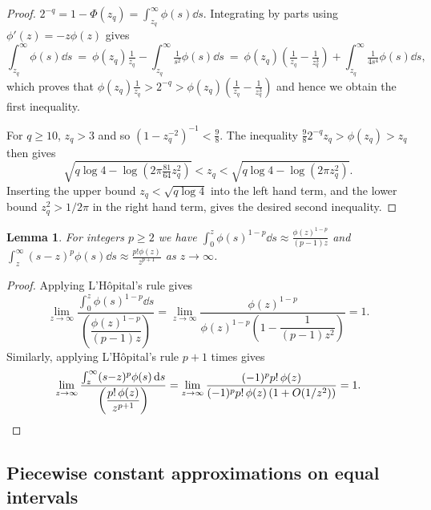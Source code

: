 \documentclass[9pt,a4paper,english]{extarticle}
\newtheorem{lemma}[theorem]{Lemma}
\begin{document}
\begin{proof}
  $ 2^{-q} = 1 - \Phi(z_q) = \int_{z_q}^{\infty} \phi(s) \dd{s} $.
  Integrating by parts using $ \phi'(z) =  -z \phi(z) $ gives
\[
\int_{z_q}^{\infty} \phi(s) \dd{s}
\ =\ \phi(z_q) \tfrac{1}{z_q} - \int_{z_q}^{\infty} \tfrac{1}{s^2} \phi(s) \dd{s}
\ =\ \phi(z_q) (\tfrac{1}{z_q} - \tfrac{1}{z^3_q}) + \int_{z_q}^{\infty} \tfrac{1}{4s^4} \phi(s) \dd{s},
\]
which proves that $\phi(z_q) \tfrac{1}{z_q} > 2^{-q} > \phi(z_q)(\tfrac{1}{z_q} - \tfrac{1}{z_q^3}) $ and hence we obtain the first inequality.

For $q \geq 10$, $z_q > 3$ and so $(1{-}z_q^{-2})^{-1} < \tfrac{9}{8}$. The inequality $\tfrac{9}{8} 2^{-q} z_q > \phi(z_q) > z_q$ then gives
\[
\sqrt{q \log 4 - \log (2\pi \tfrac{81}{64} z_q^2)} < z_q <
\sqrt{q \log 4 - \log (2\pi z_q^2)}.
\]
Inserting
the upper bound $z_q<\sqrt{q \log 4}$ into the left hand term, and
the lower bound $z_q^2 > 1/2\pi$ in the right hand term,
gives the desired second inequality.
\end{proof}

\begin{lemma}
\label{lemma:approximate_moments}
For integers $ p \geq 2 $ we have $ \int_{0}^{z} \phi(s)^{1-p} \dd{s} \approx \tfrac{\phi(z)^{1-p}}{(p-1)z}  $ and $ \int_{z}^{\infty} (s-z)^p\phi(s) \dd{s} \approx \tfrac{p!\phi(z)}{z^{p+1}} $ as $z\rightarrow\infty$.
\end{lemma}

\begin{proof}
Applying L'H\^{o}pital's rule gives
\begin{equation*}
\lim_{z \to \infty} \dfrac{\int_{0}^{z} \phi(s)^{1-p} \dd{s}}{\left(\dfrac{\phi(z)^{1-p}}{(p-1)z}\right)} 
=  \lim_{z \to \infty} \dfrac{\phi(z)^{1-p}}{\phi(z)^{1-p}\left(1 - \dfrac{1}{(p-1)z^2} \right)} 
= 1.
\end{equation*}
Similarly, applying L'H\^{o}pital's rule $p+1$ times gives
\[
\lim_{z \to \infty} \dfrac{\int_z^\infty (s{-}z)^p \phi(s) \dd{s}}{\left(\dfrac{p!\, \phi(z)}{z^{p+1}}\right)} 
=  \lim_{z \to \infty} \dfrac{(-1)^p p!\, \phi(z)}{(-1)^p p!\, \phi(z) \,(1 + O(1/z^2))}
= 1.\qedhere
\]
\end{proof}

\subsection{Piecewise constant approximations on equal intervals}
\label{sec:piecewise_constant_approximations_on_equal_intervals}
\end{document}
